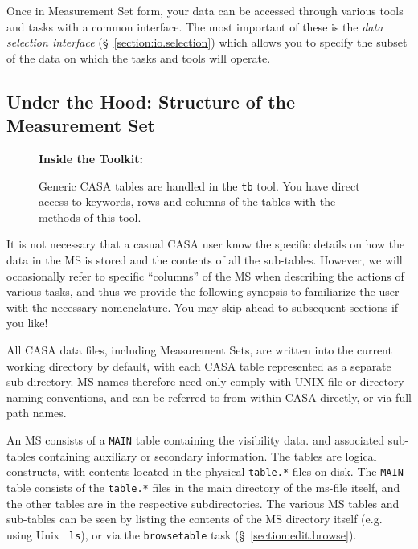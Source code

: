 Once in Measurement Set form, your data can be accessed through various tools
and tasks with a common interface.  The most important of these is the {\em
data selection interface} (\S~\ref{section:io.selection}) which allows you to
specify the subset of the data on which the tasks and tools will
operate.


\subsection{Under the Hood: Structure of the Measurement Set}
\label{section:io.ms.structure}

\begin{wrapfigure}{r}{2.5in}
  \begin{boxedminipage}{2.5in}
     \centerline{\bf Inside the Toolkit:}
     Generic CASA tables are handled in the {\tt tb} tool.
     You have direct access to keywords, rows and columns of
     the tables with the methods of this tool.
  \end{boxedminipage}
\end{wrapfigure}

It is not necessary that a casual CASA user know the specific details
on how the data in the MS is stored and the contents of all the
sub-tables.  However, we will occasionally refer to specific
``columns'' of the MS when describing the actions of various tasks,
and thus we provide the following synopsis to familiarize the user
with the necessary nomenclature.  You may skip ahead to subsequent
sections if you like!

All CASA data files, including Measurement Sets, are written into
the current working directory by default, with each CASA table
represented as a separate sub-directory.  MS names therefore need only
comply with UNIX file or directory naming conventions, and can be
referred to from within CASA directly, or via full path names.

An MS consists of a {\tt MAIN} table containing the visibility data. 
and associated sub-tables containing auxiliary or secondary
information.  The tables are logical constructs, with
contents located in the physical {\tt table.*} files on disk.  The
{\tt MAIN} table consists of the {\tt table.*} files in the main
directory of the ms-file itself, and the other tables are in the 
respective subdirectories.  The various MS tables and sub-tables can be seen by
listing the contents of the MS directory itself (e.g. using Unix {\tt
ls}), or via the {\tt browsetable} task (\S~\ref{section:edit.browse}).

